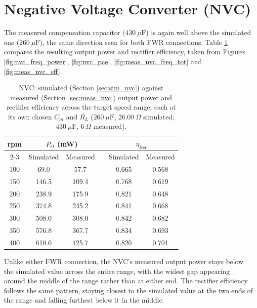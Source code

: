 \section{Negative Voltage Converter (NVC)}
\label{sec:comp_nvc}

The measured compensation capacitor ($430\ \mu\text{F}$) is again well above the simulated one ($260\ \mu\text{F}$), the same direction seen for both FWR connections. Table \ref{tab:comp_nvc} compares the resulting output power and rectifier efficiency, taken from Figures \ref{fig:nvc_freq_power}, \ref{fig:nvc_pce}, \ref{fig:meas_nvc_freq_tot} and \ref{fig:meas_nvc_eff}.

\begin{table}[htbp]
    \centering
    \begin{tabular}{cccccc}
        \toprule
        \multirow{2}{*}{rpm} & \multicolumn{2}{c}{$P_O$ (mW)} & & \multicolumn{2}{c}{$\eta_\text{Rec}$} \\
        \cmidrule{2-3} \cmidrule{5-6}
        & Simulated & Measured & & Simulated & Measured \\
        \midrule
        100 & 69.0  & 57.7  & & 0.665 & 0.568 \\
        150 & 146.5 & 109.4 & & 0.768 & 0.619 \\
        200 & 238.9 & 175.9 & & 0.821 & 0.648 \\
        250 & 374.8 & 245.2 & & 0.841 & 0.668 \\
        300 & 508.0 & 308.0 & & 0.842 & 0.682 \\
        350 & 576.8 & 367.7 & & 0.834 & 0.693 \\
        400 & 610.0 & 425.7 & & 0.820 & 0.701 \\
        \bottomrule
    \end{tabular}
    \caption{NVC: simulated (Section \ref{sec:sim_nvc}) against measured (Section \ref{sec:meas_nvc}) output power and rectifier efficiency across the target speed range, each at its own chosen $C_m$ and $R_L$ ($260\ \mu\text{F}$, $26.00\ \Omega$ simulated; $430\ \mu\text{F}$, $6\ \Omega$ measured).}
    \label{tab:comp_nvc}
\end{table}

Unlike either FWR connection, the NVC's measured output power stays below the simulated value across the entire range, with the widest gap appearing around the middle of the range rather than at either end. The rectifier efficiency follows the same pattern, staying closest to the simulated value at the two ends of the range and falling furthest below it in the middle.

